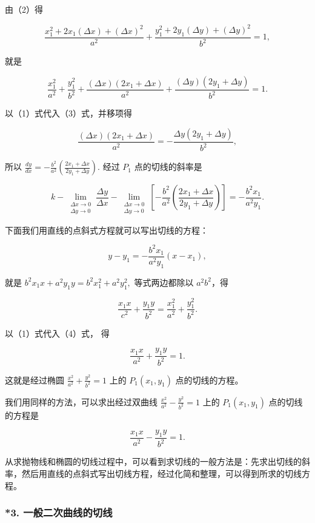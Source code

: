 由（2）得

\[
\frac {x_{1} ^ {2} + 2 x_{1} (\Delta x) + (\Delta x) ^ {2}}{a^{2}} + \frac {y_{1} ^ {2} + 2 y_{1} (\Delta y) + (\Delta y) ^ {2}}{b^{2}} = 1,
\]

就是

\[
\frac {x_{1} ^ {2}}{a^{2}} + \frac {y_{1} ^ {2}}{b^{2}} + \frac {(\Delta x) (2 x_{1} + \Delta x)}{a^{2}} + \frac {(\Delta y) (2 y_{1} + \Delta y)}{b^{2}} = 1. \tag {3}
\]

以（1）式代入（3）式，并移项得

\[
\frac {(\Delta x) (2 x_{1} + \Delta x)}{a^{2}} = - \frac {\Delta y (2 y_{1} + \Delta y)}{b^{2}},
\]

所以
\(\frac{dy}{dx} = -\frac{b^2}{a^2}\left(\frac{2x_1 + \Delta x}{2y_1 + \Delta y}\right).\)
经过 \(P_{1}\) 点的切线的斜率是

\[
k - \lim_{\substack{\Delta x\to 0\\ \Delta y\to 0}}\frac{\Delta y}{\Delta x} -\lim_{\substack{\Delta x\to 0\\ \Delta y\to 0}}\left[-\frac{b^{2}}{a^{2}}\left(\frac{2x_{1} + \Delta x}{2y_{1} + \Delta y}\right)\right] = -\frac{b^{2}x_{1}}{a^{2}y_{1}}.
\]

下面我们用直线的点斜式方程就可以写出切线的方程：

\[
y - y_{1} = - \frac {b^{2} x_{1}}{a^{2} y_{1}} (x - x_{1}),
\]

就是 \(b^{2}x_{1}x + a^{2}y_{1}y = b^{2}x_{1}^{2} + a^{2}y_{1}^{2},\)
等式两边都除以 \(a^2 b^2\)，得

\[
\frac {x_{1} x}{c^{2}} + \frac {y_{1} y}{b^{2}} = \frac {x_{1} ^ {2}}{a^{2}} + \frac {y_{1} ^ {2}}{b^{2}}. \tag {4}
\]

以（1）式代入（4）式， 得

\[
\frac {x_{1} x}{a^{2}} + \frac {y_{1} y}{b^{2}} = 1.
\]

这就是经过椭圆 \(\frac{x^2}{a^2} +\frac{y^2}{b^2} = 1\) 上的
\(P_{1}(x_{1},y_{1})\) 点的切线的方程。

我们用同样的方法，可以求出经过双曲线
\(\frac{x^{2}}{a^{2}}-\frac{y^{2}}{b^{2}}=1\) 上的
\(P_{1}(x_{1},y_{1})\) 点的切线的方程是

\[
\frac {x_{1} x}{a^{2}} - \frac {y_{1} y}{b^{2}} = 1.
\]

从求抛物线和椭圆的切线过程中，可以看到求切线的一般方法是：先求出切线的斜率，然后用直线的点斜式写出切线方程，经过化简和整理，可以得到所求的切线方程。

\subsubsection{*3.
一般二次曲线的切线}\label{ux4e00ux822cux4e8cux6b21ux66f2ux7ebfux7684ux5207ux7ebf}

